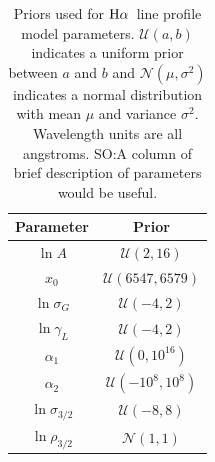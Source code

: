 \documentclass[modern, letterpaper]{aastex61}
\newcommand{\Ha}{\ensuremath{{\rm H}\alpha}}
\newcommand{\smoh}[1]{\textcolor{mediumpersianblue}{SO:#1}}
\begin{document}
\begin{table}[ht]
  \begin{center}
    \begin{tabular}{ c | c }
      \toprule
        Parameter & Prior \\\toprule
        $\ln A$ & $\mathcal{U}(2, 16)$\\
        $x_0$ & $\mathcal{U}(6547, 6579)$\\
        $\ln\sigma_G$ & $\mathcal{U}(-4, 2)$\\
        $\ln\gamma_L$ & $\mathcal{U}(-4, 2)$\\
        $\alpha_1$ & $\mathcal{U}(0, 10^{16})$\\
        $\alpha_2$ & $\mathcal{U}(-10^8, 10^8)$\\
        $\ln\sigma_{3/2}$ & $\mathcal{U}(-8, 8)$\\
        $\ln\rho_{3/2}$ & $\mathcal{N}(1, 1)$\\
      \bottomrule
    \end{tabular}
    \caption{
      Priors used for \Ha\ line profile model parameters.
      $\mathcal{U}(a, b)$ indicates a uniform prior between $a$ and $b$ and
      $\mathcal{N}(\mu, \sigma^2)$ indicates a normal distribution with mean
      $\mu$ and variance $\sigma^2$.
      Wavelength units are all angstroms.
      \smoh{A column of brief description of parameters would be useful.}
      \label{tbl:prior-bounds}
    }
  \end{center}
\end{table}
\end{document}
